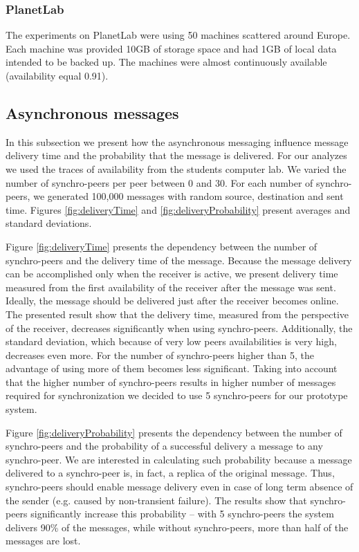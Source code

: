 \documentclass[10pt, final, conference, letterpaper]{IEEEtran}
\begin{document}
\subsubsection{PlanetLab}

The experiments on PlanetLab were using 50 machines scattered around Europe. Each machine was provided 10GB of storage space and had 1GB of local data intended to be backed up. The machines were almost continuously available (availability equal 0.91).

\subsection{Asynchronous messages}\label{sec::asynchMesExperiments}

In this subsection we present how the asynchronous messaging influence message delivery time and the probability that the message is delivered. For our analyzes we used the traces of availability from the students computer lab. We varied the number of synchro-peers per peer between 0 and 30. For each number of synchro-peers, we generated 100,000 messages with random source, destination and sent time. Figures \ref{fig:deliveryTime} and \ref{fig:deliveryProbability} present averages and standard deviations.

Figure \ref{fig:deliveryTime} presents the dependency between the number of synchro-peers and the delivery time of the message. Because the message delivery can be accomplished only when the receiver is active, we present delivery time measured from the first availability of the receiver after the message was sent. Ideally, the message should be delivered just after the receiver becomes online. The presented result show that the delivery time, measured from the perspective of the receiver, decreases significantly when using synchro-peers. Additionally, the standard deviation, which because of very low peers availabilities is very high, decreases even more. For the number of synchro-peers higher than 5, the advantage of using more of them becomes less significant. Taking into account that the higher number of synchro-peers results in higher number of messages required for synchronization we decided to use 5 synchro-peers for our prototype system.

Figure \ref{fig:deliveryProbability} presents the dependency between the number of synchro-peers and the probability of a successful delivery a message to any synchro-peer. We are interested in calculating such probability because a message delivered to a synchro-peer is, in fact, a replica of the original message. Thus, synchro-peers should enable message delivery even in case of long term absence of the sender (e.g. caused by non-transient failure). The results show that synchro-peers significantly increase this probability -- with 5 synchro-peers the system delivers 90\% of the messages, while without synchro-peers, more than half of the messages are lost.
\end{document}
